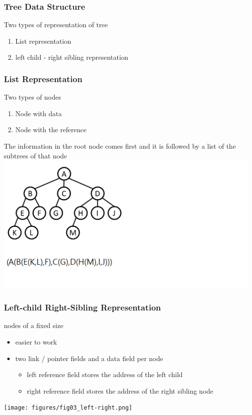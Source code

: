 \documentclass[newPxFont,sthlmFooter,nooffset]{beamer}
\begin{document}
\begin{frame}[t]
  \frametitle{Tree Data Structure}
Two types of representation of tree
  \begin{enumerate}
  \item List representation
  \item left child - right sibling representation
  \end{enumerate}
\end{frame}


\begin{frame}[t]
  \frametitle{List Representation}
Two types of nodes
  \begin{enumerate}
  \item Node with data
  \item Node with the reference
  \end{enumerate}

The information in the root node comes first and it is followed by a list of the subtrees of that node
\includegraphics[height=0.6\textheight]{figures/fig03_list_rep.png}
\end{frame}


\begin{frame}[t]
  \frametitle{Left-child Right-Sibling Representation}
nodes of a fixed size
\begin{itemize}
\item easier to work
\item two link / pointer fields and a data field per node
  \begin{itemize}
  \item left reference field stores the address of the left child
  \item right reference field stores the address of the right sibling node
  \end{itemize}
\end{itemize}
\begin{center}
  \texttt{[image: figures/fig03\_left-right.png]}
\end{center}

\end{frame}
\end{document}
